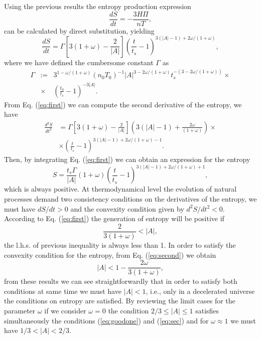 \documentclass[twocolumn,showpacs,nofootinbib,floats,amsmath,amssymb]{revtex4}
\begin{document}
Using the previous results the entropy production expression
\begin{equation}
\frac{dS}{dt} = -\frac{3H\Pi}{nT},
\label{eq:dergen}
\end{equation}
can be calculated by direct substitution, yielding
\begin{equation}
\frac{dS}{dt} = \Gamma \left[3(1+\omega)-\frac{2}{\left|A\right|} \right]\left(\frac{t}{t_{s}}-1 \right)^{3(\left|A\right|-1)+2\omega/(1+\omega)},
\label{eq:first}
\end{equation}
where we have defined the cumbersome constant $\Gamma$ as 
\begin{eqnarray}
\Gamma &:=& 3^{1-\omega/(1+\omega)}(n_{0}T_{0})^{-1}\left|A\right|^{3-2\omega/(1+\omega)}t_{s}^{-(3-2\omega/(1+\omega))}\times \nonumber \\ 
& \times & \left(\frac{t_{0}}{t_{s}}-1\right)^{-3\left|A\right|}.
\end{eqnarray} 
From Eq. (\ref{eq:first}) we can compute the second derivative of the entropy, we have
\begin{eqnarray}
\frac{d^{2}S}{dt^{2}} &= \Gamma \left[3(1+\omega)-\frac{2}{\left|A\right|} \right]\left(3(\left|A\right|-1)+\frac{2\omega}{(1+\omega)} \right)\times \nonumber \\
& \times \left(\frac{t}{t_{s}}-1 \right)^{3(\left|A\right|-1)+2\omega/(1+\omega)-1}.
\label{eq:second} 
\end{eqnarray} 
Then, by integrating Eq. (\ref{eq:first}) we can obtain an expression for the entropy
\begin{equation}
S = \frac{t_{s}\Gamma}{\left|A\right|}(1+\omega)\left(\frac{t}{t_{s}}-1\right)^{3\left(\left|A\right| -1\right)+2\omega/(1+\omega)+1},
\label{eq:entropy}
\end{equation}
which is always positive. At thermodynamical level the evolution of natural processes demand two consistency conditions on the derivatives of the entropy, we must have $dS/dt > 0$ and the convexity condition given by $d^{2}S/dt^{2} < 0$. According to Eq. (\ref{eq:first}) the generation of entropy will be positive if
\begin{equation}
\frac{2}{3(1+\omega)} < \left|A\right|,
\label{eq:goodone} 
\end{equation}  
the l.h.s. of previous inequality is always less than 1. In order to satisfy the convexity condition for the entropy, from Eq. (\ref{eq:second}) we obtain
\begin{equation}
\left|A\right| < 1-\frac{2\omega}{3(1+\omega)},
\label{eq:sec}
\end{equation}
from these results we can see straightforwardly that in order to satisfy both conditions at same time we must have $\left|A\right| < 1$, i.e., only in a decelerated universe the conditions on entropy are satisfied. By reviewing the limit cases for the parameter $\omega$ if we consider $\omega = 0$ the condition $2/3 \leq \left|A\right| \leq 1$ satisfies simultaneously the conditions (\ref{eq:goodone}) and (\ref{eq:sec}) and for $\omega \approx 1$ we must have $1/3 < \left|A\right| < 2/3$.\\
 
\end{document}
